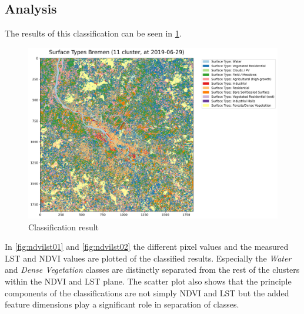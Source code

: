 \documentclass[12pt,a4paper, english,twoside]{scrartcl}
\begin{document}
    \subsection{Analysis}\label{sec:landcoverAnalysis} 
      The results of this classification can be seen in \cref{fig:classification}. \\%
      \begin{figure}[!htbp]
       \begin{center}
         \includegraphics[width=\textwidth]{img/Classification.png}
       \end{center}
       \caption{Classification result}\label{fig:classification}
      \end{figure}
      \noindent
    In \cref{fig:ndvilst01} and \cref{fig:ndvilst02} the different pixel values and the measured \gls{LST} and \gls{NDVI} values are plotted of the classified results. 
    Especially the \textit{Water} and \textit{Dense Vegetation} classes are distinctly separated from the rest of the clusters within the \gls{NDVI} and \gls{LST} plane. 
    The scatter plot also shows that the principle components of the classifications are not simply \gls{NDVI} and \gls{LST} but the added feature dimensions play a significant role in separation of classes.\\
\end{document}
